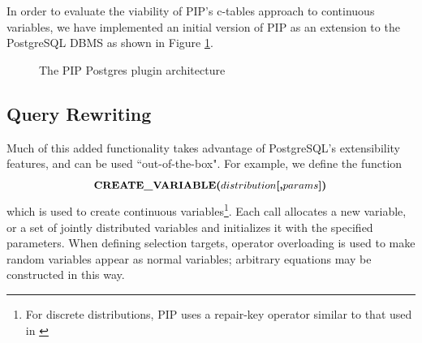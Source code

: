 In order to evaluate the viability of PIP's c-tables approach to continuous variables, we have implemented an initial version of PIP as an extension to the PostgreSQL DBMS as shown in Figure \ref{fig:blockdiag}.  %

\begin{figure}
\begin{center}
\caption{The PIP Postgres plugin architecture}
\label{fig:blockdiag}
\end{center}
\vspace*{-0.3in}
\end{figure}

\subsection{Query Rewriting}
Much of this added functionality takes advantage of PostgreSQL's extensibility features, and can be used ``out-of-the-box".  For example, we define the function \vspace*{-0.1in}
\[
\mbox{\textbf{\footnotesize CREATE\_VARIABLE($distribution$[,$params$])}}\vspace*{-0.1in}
\]
which is used to create continuous variables\footnote{For discrete distributions, PIP uses a repair-key operator similar to that used in \cite{KochMayBMS2008}}.  Each call allocates a new variable, or a set of jointly distributed variables and initializes it with the specified parameters.  When defining selection targets, operator overloading is used to make random variables appear as normal variables; arbitrary equations may be constructed in this way.  

